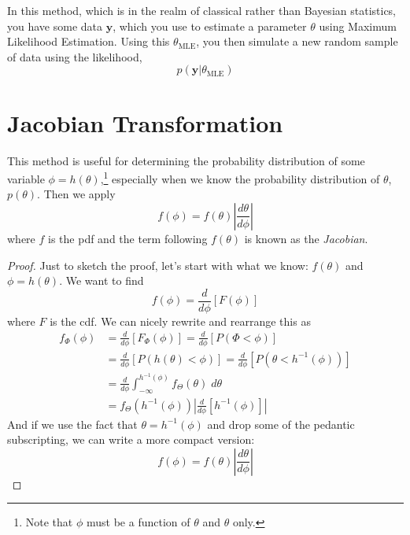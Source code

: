 \documentclass[12pt]{article}
\begin{document}
In this method, which is in the realm of classical rather than Bayesian
statistics, you have some data $\mathbf{y}$, which you use to estimate
a parameter $\theta$ using Maximum Likelihood Estimation. Using
this $\theta_{\text{MLE}}$, you then simulate a new random sample of 
data using the likelihood,
\[ p(\mathbf{y} | \theta_{\text{MLE}}) \]

\section{Jacobian Transformation}

This method is useful for determining the probability distribution
of some variable $\phi = h(\theta)$,\footnote{Note that $\phi$ must be a 
function of $\theta$ and $\theta$ only.} especially
when we know the probability distribution 
of $\theta$, $p(\theta)$.  Then we apply
   \[ f(\phi) = f(\theta) \left\lvert 
      \frac{d\theta}{d\phi} \right\rvert \]
where $f$ is the pdf and the term following $f(\theta)$ is known as 
the \emph{Jacobian}.

\begin{proof} 
   Just to sketch the proof, let's start with what we know:
   $f(\theta)$ and $\phi = h(\theta)$. We want to find
      \[ f(\phi) = \frac{d}{d\phi} \left[ F(\phi) \right] \]
   where $F$ is the cdf. We can nicely rewrite and rearrange this as
   \begin{align*}
      f_\Phi(\phi) &= \frac{d}{d\phi} 
      \left[ F_\Phi(\phi) \right] = 
      \frac{d}{d\phi} \left[ P(\Phi < \phi ) \right]
      \\
      &= \frac{d}{d\phi} \left[ P( h(\theta) < \phi ) \right]
	 = \frac{d}{d\phi} \left[ P( \theta < h^{-1}(\phi) )  \right]
      \\ 
      &= \frac{d}{d\phi} \int^{h^{-1}(\phi)}_{-\infty} 
	 f_\Theta(\theta)\; d\theta
      \\
      &= f_\Theta\left( h^{-1}(\phi) \right) \left\lvert 
	 \frac{d}{d\phi} \left[ h^{-1}(\phi) \right] \right\rvert
   \end{align*}
And if we use the fact that $\theta = h^{-1}(\phi)$ and drop some of the
pedantic subscripting, we can write a more compact version:
   \[ f(\phi) = f(\theta) \left\lvert 
      \frac{d\theta}{d\phi} \right\rvert\]

\end{proof}
\end{document}
